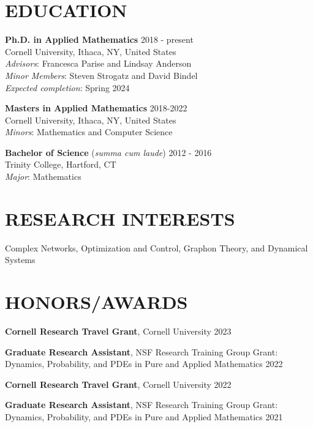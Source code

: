 \documentclass{res} %
\begin{document}
\begin{resume}

\section{EDUCATION}  
\smallskip
\textbf{Ph.D. in Applied Mathematics} \hfill 2018 - present\\
Cornell University, Ithaca, NY, United States\\
\textit{Advisors}: Francesca Parise and Lindsay Anderson \\
\textit{Minor Members}: Steven Strogatz and David Bindel\\
\textit{Expected completion}: Spring 2024
\smallskip

\textbf{Masters in Applied Mathematics} \hfill 2018-2022\\
Cornell University, Ithaca, NY, United States\\
\textit{Minors}: Mathematics and Computer Science
\smallskip

\textbf{Bachelor of Science} (\textit{summa cum laude}) \hfill 2012 - 2016 \\
Trinity College, Hartford, CT\\
\textit{Major}: Mathematics\\


\section{RESEARCH INTERESTS} 
\smallskip
Complex Networks, Optimization and Control, Graphon Theory, and Dynamical Systems 

\section{HONORS/AWARDS}
\smallskip

{\bf Cornell Research Travel Grant}, Cornell University \hfill2023 

{\bf Graduate Research Assistant}, NSF Research Training Group Grant: \\ Dynamics, Probability, and PDEs in Pure and Applied Mathematics \hfill2022 

{\bf Cornell Research Travel Grant}, Cornell University \hfill2022 

{\bf Graduate Research Assistant}, NSF Research Training Group Grant: \\ Dynamics, Probability, and PDEs in Pure and Applied Mathematics \hfill2021 


\end{resume}
\end{document}
